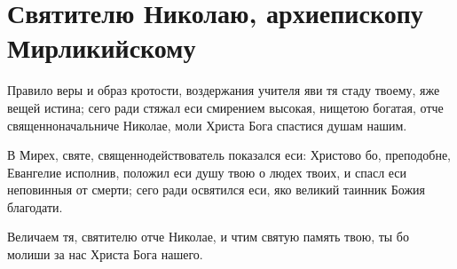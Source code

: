 \section{Святителю Николаю, архиепископу Мирликийскому}\begin{mymulticols}
 


Правило веры и образ кротости, воздержания учителя яви тя стаду твоему, яже вещей истина; сего ради стяжал еси смирением высокая, нищетою богатая, отче священноначальниче Николае, моли Христа Бога спастися душам нашим.


В Мирех, святе, священнодействователь показался еси: Христово бо, преподобне, Евангелие исполнив, положил еси душу твою о людех твоих, и спасл еси неповинныя от смерти; сего ради освятился еси, яко великий таинник Божия благодати.


Величаем тя, святителю отче Николае, и чтим святую память твою, ты бо молиши за нас Христа Бога нашего.



\end{mymulticols}
